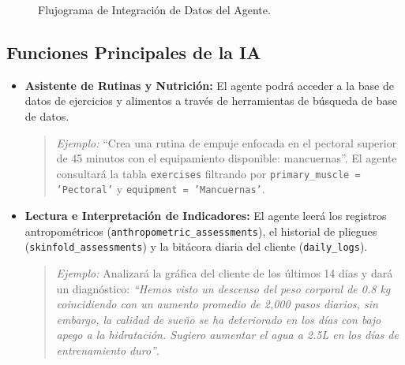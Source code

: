 \documentclass[11pt]{article}
\begin{document}
\begin{figure}[h]
\centering
{}
\caption{Flujograma de Integración de Datos del Agente.}
\end{figure}

\subsection{Funciones Principales de la IA}
\begin{itemize}
    \item \textbf{Asistente de Rutinas y Nutrición:} El agente podrá acceder a la base de datos de ejercicios y alimentos a través de herramientas de búsqueda de base de datos.
    \begin{quote}\footnotesize
        \textit{Ejemplo:} ``Crea una rutina de empuje enfocada en el pectoral superior de 45 minutos con el equipamiento disponible: mancuernas''. El agente consultará la tabla \texttt{exercises} filtrando por \texttt{primary\_muscle = 'Pectoral'} y \texttt{equipment = 'Mancuernas'}.
    \end{quote}
    \item \textbf{Lectura e Interpretación de Indicadores:} El agente leerá los registros antropométricos (\texttt{anthropometric\_assessments}), el historial de pliegues (\texttt{skinfold\_assessments}) y la bitácora diaria del cliente (\texttt{daily\_logs}).
    \begin{quote}\footnotesize
        \textit{Ejemplo:} Analizará la gráfica del cliente de los últimos 14 días y dará un diagnóstico: \textit{``Hemos visto un descenso del peso corporal de 0.8 kg coincidiendo con un aumento promedio de 2,000 pasos diarios, sin embargo, la calidad de sueño se ha deteriorado en los días con bajo apego a la hidratación. Sugiero aumentar el agua a 2.5L en los días de entrenamiento duro''}.
    \end{quote}
\end{itemize}
\end{document}
